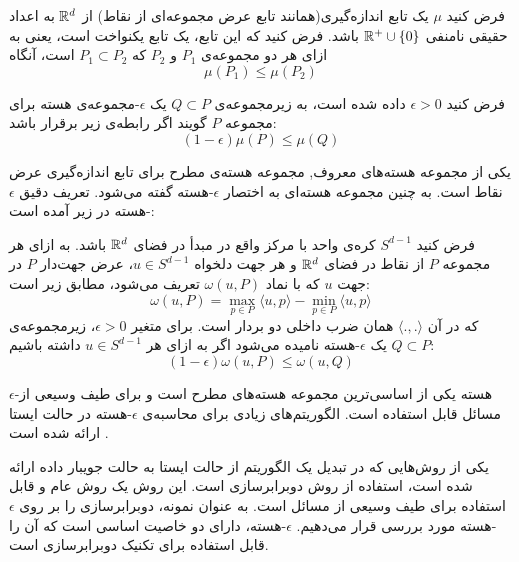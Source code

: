 فرض کنید $\mu$ یک تابع اندازه‌گیری(همانند تابع عرض مجموعه‌ای از نقاط) از $\mathbb{R}^d$ به اعداد حقیقی نامنفی $\mathbb{R}^+ \cup \left\{ 0 \right\}$ باشد.
فرض کنید که این تابع، یک تابع یکنواخت است، یعنی به ازای هر دو مجموعه‌ی $P_1$ و $P_2$ که $P_1 \subset P_2$ است، آنگاه
$$\mu(P_1) \leq \mu(P_2)$$

فرض کنید $\epsilon > 0$ داده شده است، به زیرمجموعه‌ی $Q \subset P$ یک $\epsilon$-مجموعه‌ی هسته برای مجموعه $P$ گویند اگر رابطه‌ی زیر برقرار باشد:
$$(1 - \epsilon) \mu(P) \leq \mu (Q)$$


یکی از مجموعه هسته‌های معروف, مجموعه هسته‌ی مطرح برای تابع اندازه‌گیری عرض نقاط است. به چنین مجموعه هسته‌ای به اختصار $\epsilon$-هسته گفته می‌شود. تعریف دقیق $\epsilon$-هسته در زیر آمده است:


فرض کنید $S^{d-1}$ کره‌ی واحد با مرکز واقع در مبدأ در فضای $\mathbb{R}^d$ باشد.
به ازای هر مجموعه $P$ از‌ نقاط در فضای $\mathbb{R}^d$ و هر جهت دلخواه $u \in S^{d-1}$، عرض جهت‌دار $P$ در جهت $u$ که با نماد $\omega(u, P)$ تعریف می‌شود، مطابق زیر است:
$$\omega(u, P) = \max_{p \in P} \langle u, p\rangle - \min_{p \in P} \langle u, p \rangle$$
که در آن $\langle ., . \rangle$ همان ضرب داخلی دو بردار است.
برای متغیر $\epsilon > 0$، زیرمجموعه‌ی $Q \subset P$ یک $\epsilon$-هسته نامیده می‌شود اگر به ازای هر $u \in S^{d-1}$ داشته باشیم:
$$(1 - \epsilon) \omega(u, P) \leq \omega(u, Q)$$


$\epsilon$-هسته 
یکی از اساسی‌ترین مجموعه هسته‌های مطرح است و برای طیف وسیعی از مسائل قابل استفاده است.
الگوریتم‌های زیادی برای محاسبه‌ی $\epsilon$-هسته در حالت ایستا ارائه شده است . 

یکی از روش‌هایی که در تبدیل یک الگوریتم از حالت ایستا به حالت جویبار داده ارائه شده است، استفاده از روش دوبرابرسازی است.
این روش یک روش عام و قابل استفاده برای طیف وسیعی از مسائل است.
به عنوان نمونه، دوبرابرسازی را بر روی $\epsilon$-هسته مورد بررسی قرار می‌دهیم. $\epsilon$-هسته، دارای دو خاصیت اساسی است که آن را قابل استفاده برای تکنیک دوبرابرسازی است.






